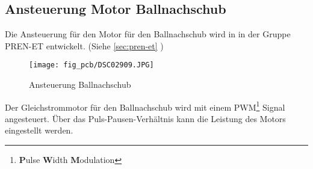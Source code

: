 \subsection{Ansteuerung Motor Ballnachschub}
\label{sec:dc}
Die Ansteuerung für den Motor für den Ballnachschub wird in in der Gruppe 
PREN-ET entwickelt. (Siehe \ref{sec:pren-et} )
\begin{figure}[h!]
    \centering
    \texttt{[image: fig\_pcb/DSC02909.JPG]}
    \caption{Ansteuerung Ballnachschub}
    \label{fig:dc}
\end{figure}

\noindent
Der Gleichstrommotor für den Ballnachschub wird mit einem 
PWM\footnote{\textbf{P}ulse \textbf{W}idth \textbf{M}odulation} Signal 
angesteuert. Über das Puls-Pausen-Verhältnis kann die Leistung des Motors 
eingestellt werden. 

